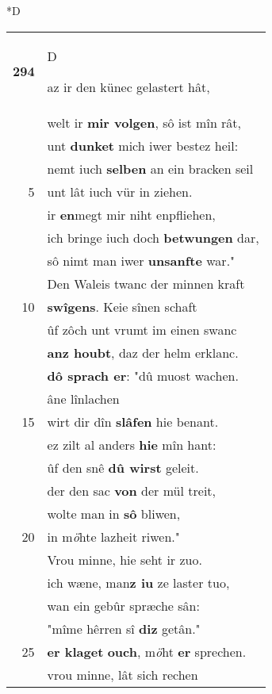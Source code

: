 \documentclass[8pt,a4paper,notitlepage]{article}
\begin{document}
\begin{table}[ht]
\begin{minipage}[t]{0.5\linewidth}
\small
\begin{center}*D
\end{center}
\begin{tabular}{rl}
\textbf{294} & \begin{large}D\end{large}az ir den künec gelastert hât,\\ 
 & welt ir \textbf{mir volgen}, sô ist mîn rât,\\ 
 & unt \textbf{dunket} mich iwer bestez heil:\\ 
 & nemt iuch \textbf{selben} an ein bracken seil\\ 
5 & unt lât iuch vür in ziehen.\\ 
 & ir \textbf{en}megt mir niht enpfliehen,\\ 
 & ich bringe iuch doch \textbf{betwungen} dar,\\ 
 & sô nimt man iwer \textbf{unsanfte} war."\\ 
 & Den Waleis twanc der minnen kraft\\ 
10 & \textbf{swîgens}. Keie sînen schaft\\ 
 & ûf zôch unt vrumt im einen swanc\\ 
 & \textbf{anz houbt}, daz der helm erklanc.\\ 
 & \textbf{dô sprach er}: "dû muost wachen.\\ 
 & âne lînlachen\\ 
15 & wirt dir dîn \textbf{slâfen} hie benant.\\ 
 & ez zilt al anders \textbf{hie} mîn hant:\\ 
 & ûf den snê \textbf{dû wirst} geleit.\\ 
 & der den sac \textbf{von} der mül treit,\\ 
 & wolte man in \textbf{sô} bliwen,\\ 
20 & in m\textit{ö}hte lazheit riwen."\\ 
 & Vrou minne, hie seht ir zuo.\\ 
 & ich wæne, man\textbf{z iu} ze laster tuo,\\ 
 & wan ein gebûr spræche sân:\\ 
 & "mîme hêrren sî \textbf{diz} getân."\\ 
25 & \textbf{er klaget} \textbf{ouch}, m\textit{ö}ht \textbf{er} sprechen.\\ 
 & vrou minne, lât sich rechen\\ 

\end{tabular}
\end{minipage}
\end{table}
\end{document}
